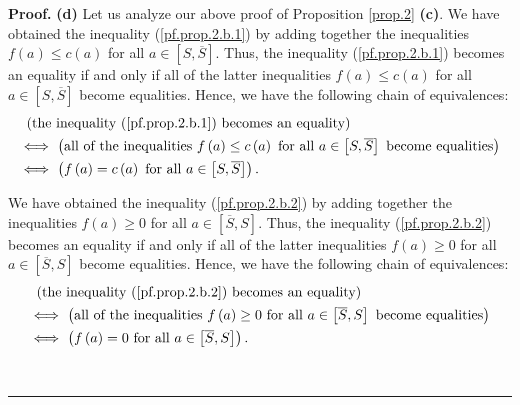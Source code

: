 \documentclass[numbers=enddot,12pt,final,onecolumn,notitlepage]{scrartcl}%
\theoremstyle{definition}
\newenvironment{proof}[1][Proof]{\noindent\textbf{#1.} }{\ \rule{0.5em}{0.5em}}
\begin{document}
\begin{proof}
\textbf{(d)} Let us analyze our above proof of Proposition \ref{prop.2}
\textbf{(c)}. We have obtained the inequality (\ref{pf.prop.2.b.1}) by adding
together the inequalities $f\left(  a\right)  \leq c\left(  a\right)  $ for
all $a\in\left[  S,\overline{S}\right]  $. Thus, the inequality
(\ref{pf.prop.2.b.1}) becomes an equality if and only if all of the latter
inequalities $f\left(  a\right)  \leq c\left(  a\right)  $ for all
$a\in\left[  S,\overline{S}\right]  $ become equalities. Hence, we have the
following chain of equivalences:%
\begin{align*}
&  \ \left(  \text{the inequality (\ref{pf.prop.2.b.1}) becomes an
equality}\right) \\
&  \Longleftrightarrow\ \left(  \text{all of the inequalities }f\left(
a\right)  \leq c\left(  a\right)  \text{ for all }a\in\left[  S,\overline
{S}\right]  \text{ become equalities}\right) \\
&  \Longleftrightarrow\ \left(  f\left(  a\right)  =c\left(  a\right)  \text{
for all }a\in\left[  S,\overline{S}\right]  \right)  .
\end{align*}


We have obtained the inequality (\ref{pf.prop.2.b.2}) by adding together the
inequalities $f\left(  a\right)  \geq0$ for all $a\in\left[  \overline
{S},S\right]  $. Thus, the inequality (\ref{pf.prop.2.b.2}) becomes an
equality if and only if all of the latter inequalities $f\left(  a\right)
\geq0$ for all $a\in\left[  \overline{S},S\right]  $ become equalities. Hence,
we have the following chain of equivalences:%
\begin{align*}
&  \ \left(  \text{the inequality (\ref{pf.prop.2.b.2}) becomes an
equality}\right) \\
&  \Longleftrightarrow\ \left(  \text{all of the inequalities }f\left(
a\right)  \geq0\text{ for all }a\in\left[  \overline{S},S\right]  \text{
become equalities}\right) \\
&  \Longleftrightarrow\ \left(  f\left(  a\right)  =0\text{ for all }%
a\in\left[  \overline{S},S\right]  \right)  .
\end{align*}



\end{proof}
\end{document}
